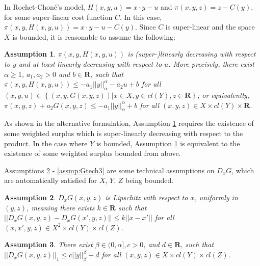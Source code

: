 \documentclass[a4paper, 11pt]{amsart}
\numberwithin{equation}{section}
\theoremstyle{plain}
\newtheorem{assumption}{Assumption}
\theoremstyle{definition}
\theoremstyle{remark}
\newcommand{\R}{\mathbf{R}}
\begin{document}
In Rochet-Chon\'e's model, $H(x,y,u) = x\cdot y -u$ and $\pi(x,y,z) = z-C(y)$, for some super-linear cost function $C$. In this case, $\pi(x,y,H(x,y,u)) = x\cdot y -u -C(y)$. Since $C$ is super-linear and the space $X$ is bounded, it is reasonable to assume the following:\medskip


	\begin{assumption}\label{assmp:Gtech0}
		$\pi(x,y,H(x,y,u))$ is {\color{purple}(super-)linearly decreasing with respect to $y$ and at least linearly decreasing with respect to $u$}. More precisely, there exist $\alpha \ge 1$, $a_1, a_2> 0$ and $b\in \R$, such that $\pi(x,y,H(x,y,u)) \le -a_1 ||y||_{\alpha}^{\alpha} - a_2 u +b$ for all $ (x, y, u)\in \left\{ (x,y, G(x,y,z))| x\in X, y\in cl(Y), z\in \R \right\}$; or equivalently, $\pi(x,y,z) + a_2 G(x,y,z) \le -a_1 ||y||_{\alpha}^{\alpha}  +b$ for all $ (x, y, z)\in X\times cl(Y)\times \R$.
	\end{assumption}
	
	
	As shown in the alternative formulation, Assumption \ref{assmp:Gtech0} requires the existence of some weighted surplus which is super-linearly decreasing with respect to the product. In the case where $Y$ is bounded, Assumption \ref{assmp:Gtech0} is equivalent to the existence of some weighted surplus bounded from above.   \medskip






Assumptions \ref{assmp:Gtech1} - \ref{assmp:Gtech3} are some technical assumptions on $D_xG$, which are automatically satisfied for $X$, $Y$, $Z$ being bounded.\medskip


\begin{assumption}\label{assmp:Gtech1}
	{$D_x G(x,y,z)$ is Lipschitz with respect to $x$},
	uniformly in $(y,z)$, meaning there exists $k\in \R$ such that
	$||D_xG(x,y,z)-D_x G(x',y,z)||\le k||x-x'||$ %
	for all $(x, x',y, z)\in X^2\times cl(Y) \times cl(Z)$.
\end{assumption}


\begin{assumption}\label{assmp:Gtech2}
	 There exist $ \beta \in (0, \alpha], c>0$, and $ d\in \R$, such that $||D_x G(x,y,z)||_{1}\le c||y||_{\beta}^{\beta} +d$ for all $ (x, y, z)\in X\times cl(Y) \times cl(Z)$.
\end{assumption}
\end{document}
